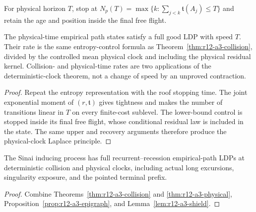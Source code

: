 For physical horizon $T$, stop at
$N_p(T)=\max\{k:\sum_{j<k}\mathfrak t(A_j)\le T\}$ and retain the age and
position inside the final free flight.

\begin{theorem}
\label{thm:r12-a3-physical}
The physical-time empirical path states satisfy a full good LDP with speed
$T$.  Their rate is the same entropy-control formula as
Theorem~\ref{thm:r12-a3-collision}, divided by the controlled mean physical
clock and including the physical residual kernel.  Collision- and
physical-time rates are two applications of the deterministic-clock theorem,
not a change of speed by an unproved contraction.
\end{theorem}

\begin{proof}
Repeat the entropy representation with the roof stopping time.  The joint
exponential moment of $(r,\mathfrak t)$ gives tightness and makes the number of
transitions linear in $T$ on every finite-cost sublevel.  The lower-bound
control is stopped inside its final free flight, whose conditional residual
law is included in the state.  The same upper and recovery arguments therefore
produce the physical-clock Laplace principle.
\end{proof}

\begin{theorem}
\label{thm:r12-a3-main}
The Sinai inducing process has full recurrent--recession empirical-path LDPs
at deterministic collision and physical clocks, including actual long
excursions, singularity exposure, and the pointed terminal prefix.
\end{theorem}

\begin{proof}
Combine Theorems~\ref{thm:r12-a3-collision} and
\ref{thm:r12-a3-physical}, Proposition~\ref{prop:r12-a3-epigraph}, and
Lemma~\ref{lem:r12-a3-shield}.
\end{proof}
